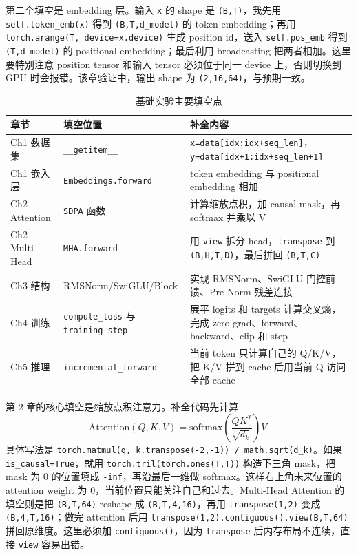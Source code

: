 \documentclass[12pt,a4paper,UTF8]{ctexart}
\newcommand{\xiaosi}{\fontsize{12pt}{18pt}\selectfont}
\newenvironment{reportbody}{\songti\xiaosi\onehalfspacing\sloppy}{}
\begin{document}
\begin{reportbody}
第二个填空是 embedding 层。输入 \texttt{x} 的 shape 是 \texttt{(B,T)}，我先用 \texttt{self.token\_emb(x)} 得到 \texttt{(B,T,d\_model)} 的 token embedding；再用 \texttt{torch.arange(T, device=x.device)} 生成 position id，送入 \texttt{self.pos\_emb} 得到 \texttt{(T,d\_model)} 的 positional embedding；最后利用 broadcasting 把两者相加。这里要特别注意 position tensor 和输入 tensor 必须位于同一 device 上，否则切换到 GPU 时会报错。该章验证中，输出 shape 为 \texttt{(2,16,64)}，与预期一致。

\begin{table}[htbp]
  \caption{基础实验主要填空点}
  \centering
  \begin{tabular}{@{}C{30mm}C{42mm}C{58mm}@{}}
    \toprule
    章节 & 填空位置 & 补全内容 \\
    \midrule
    Ch1 数据集 & \texttt{\_\_getitem\_\_} & \texttt{x=data[idx:idx+seq\_len]}，\texttt{y=data[idx+1:idx+seq\_len+1]} \\
    Ch1 嵌入层 & \texttt{Embeddings.forward} & token embedding 与 positional embedding 相加 \\
    Ch2 Attention & \texttt{SDPA} 函数 & 计算缩放点积，加 causal mask，再 softmax 并乘以 V \\
    Ch2 Multi-Head & \texttt{MHA.forward} & 用 \texttt{view} 拆分 head，\texttt{transpose} 到 \texttt{(B,H,T,D)}，最后拼回 \texttt{(B,T,C)} \\
    Ch3 结构 & RMSNorm/SwiGLU/Block & 实现 RMSNorm、SwiGLU 门控前馈、Pre-Norm 残差连接 \\
    Ch4 训练 & \texttt{compute\_loss} 与 \texttt{training\_step} & 展平 logits 和 targets 计算交叉熵，完成 zero grad、forward、backward、clip 和 step \\
    Ch5 推理 & \texttt{incremental\_forward} & 当前 token 只计算自己的 Q/K/V，把 K/V 拼到 cache 后用当前 Q 访问全部 cache \\
    \bottomrule
  \end{tabular}
\end{table}

第 2 章的核心填空是缩放点积注意力。补全代码先计算
\[
\mathrm{Attention}(Q,K,V)=\mathrm{softmax}\left(\frac{QK^T}{\sqrt{d_k}}\right)V.
\]
具体写法是 \texttt{torch.matmul(q, k.transpose(-2,-1)) / math.sqrt(d\_k)}。如果 \texttt{is\_causal=True}，就用 \texttt{torch.tril(torch.ones(T,T))} 构造下三角 mask，把 mask 为 0 的位置填成 \texttt{-inf}，再沿最后一维做 softmax。这样右上角未来位置的 attention weight 为 0，当前位置只能关注自己和过去。Multi-Head Attention 的填空则是把 \texttt{(B,T,64)} reshape 成 \texttt{(B,T,4,16)}，再用 \texttt{transpose(1,2)} 变成 \texttt{(B,4,T,16)}；做完 attention 后用 \texttt{transpose(1,2).contiguous().view(B,T,64)} 拼回原维度。这里必须加 \texttt{contiguous()}，因为 \texttt{transpose} 后内存布局不连续，直接 \texttt{view} 容易出错。


\end{reportbody}
\end{document}
